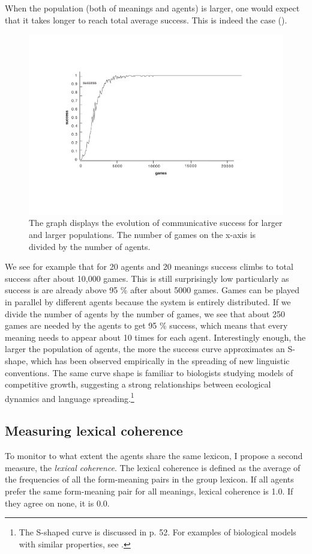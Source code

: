 When the population (both of meanings and agents) is larger, 
one would expect that it takes longer to reach total average
success. This is indeed the case (). 
\begin{figure}[htbp]
  \centerline{\includegraphics[width=.70\textwidth]{chap5/figs/larger}}
\caption{\footnotesize \label{larger} 
The graph displays the evolution of communicative success
for larger and larger populations. The
number of games on the x-axis
is divided by the number of agents. }
\end{figure}
We see for example that for 20 agents and 20 meanings 
success climbs to total success after about 10,000 games.
This is still surprisingly low particularly as
success is
are already above 95 \% after about 5000 games. Games can be played
in parallel by different agents because the system 
is entirely distributed. If we divide
the number of agents by the number of games, we see that about 250
games are needed by the agents to get 95 \% success, which means
that every meaning needs to appear about 10 times for each agent. 
Interestingly enough, the larger the population of agents, 
the more the success curve approximates an 
S-shape, which has 
been observed empirically in the spreading of new
linguistic conventions. The same curve shape is familiar to
biologists studying models of competitive growth, suggesting 
a strong relationships between ecological dynamics and language
spreading.\footnote{The S-shaped curve is discussed in \cite{McMahon:1994} p. 52. For examples
of biological models with similar properties, see \cite{May:1976}.}

\subsection{Measuring lexical coherence} 

To monitor to what extent the agents share the same
lexicon, I propose a second measure, the {\itshape lexical
coherence}. The lexical coherence is 
defined as the average of the frequencies of
all the form-meaning pairs in the group lexicon.
If all agents prefer the same form-meaning 
pair for all meanings, lexical coherence is 1.0. If they agree
on none, it is 0.0.

